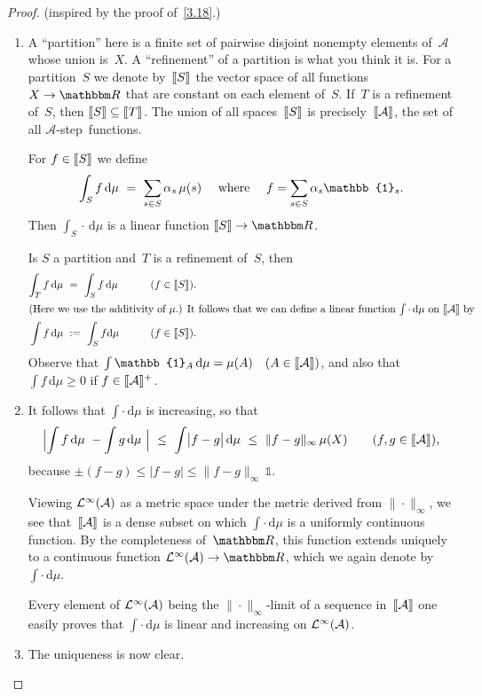\documentclass[main.tex]{subfiles}
\begin{document}
\begin{proof}
(inspired by the proof of~\ref{3.18}.)
\begin{enumerate}[label=(\Roman*)]
\item\label{6.10-I}
A ``partition'' here is a finite set of pairwise disjoint 
nonempty elements of~$\mathcal A$
whose union is~$X$.
A ``refinement'' of a partition is what you think it is.
For a partition~$S$ we denote by~$\lbb S\rbb$
the vector space of all functions $X\ra \R$
that are constant on each element of~$S$.
If~$T$ is a refinement of~$S$,
then $\lbb S \rbb \subseteq \lbb T \rbb$.
The union of all spaces~$\lbb S \rbb$ is precisely~$\lbb \mathcal A \rbb$,
the set of all $\mathcal{A}$-step~functions.

For $f\in\lbb S \rbb$ we define
\begin{equation*}
\int_S f\,\mathrm{d}\mu\ =\ \sum_{s\in S} \alpha_s\,\mu(s)
\quad\htam{ where }\quad f=\sum_{s\in S} \alpha_s \mathbb{1}_s\htam{.}
\end{equation*}
Then $\int_S \cdot\,\mathrm{d}\mu$ is a linear function $\lbb S \rbb \ra \R$.

Is $S$ a partition and~$T$ is a refinement of~$S$, then
\begin{alignat*}{2}
\int_T f\,\mathrm{d}\mu\ &=\ \int_S 
f\,\mathrm{d}\mu\qquad&(f\in \lbb S \rbb)\htam{.} \\
\intertext{(Here we use the additivity of~$\mu$.)
It follows that we can define a linear function $\int\cdot\,\mathrm d\mu$
on~$\lbb \mathcal A \rbb$ by}
\int f\,\mathrm{d}\mu\ &:=\ \int_S f\mathrm{d}\mu
 \qquad &(f\in\lbb S \rbb)\htam{.}
\end{alignat*}
Observe that $\int \mathbb{1}_A\,\mathrm{d}\mu=\mu(A)
\quad(A\in\lbb \mathcal A \rbb)$,
and also that $\int f\,\mathrm{d}\mu\geq 0$
if $f\in\lbb\mathcal{A}\rbb^+$.
%
\item\label{6.10-II}
It follows that $\int\cdot\,\mathrm{d}\mu$ is increasing, so that
\begin{equation*}
\Bigl|\int f\,\mathrm{d}\mu\  -\int g\,\mathrm{d}\mu\  \Bigr|
\ \leq\ \int \bigl|f-g\bigr|\,\mathrm{d}\mu
\ \leq\ \|f-g\|_\infty \,\mu(X)\qquad(f,g\in\lbb \mathcal A \rbb)
\htam{,}
\end{equation*}
because $\pm(f-g)\leq|f-g|\leq\|f-g\|_\infty\,\mathbb{1}$.

Viewing $\mathcal{L}^\infty(\mathcal A)$ as a metric space
under the metric derived from $\|\cdot\|_\infty$,
we see that~$\lbb\mathcal{A}\rbb$ is a dense subset
on which $\int\cdot\,\mathrm d\mu$ is a uniformly continuous function.
By the completeness of~$\R$,
this function extends uniquely to a continuous function
$\BLeb(\mathcal A)\ra \R$,
which we again denote by $\int\cdot\,\mathrm{d}\mu$.

Every element of $\mathcal{L}^\infty(\mathcal A)$ being the $\|\cdot\|_\infty$-limit
of a sequence in~$\lbb\mathcal A\rbb$
one easily proves that $\int\cdot\,\mathrm d\mu$ is linear
and increasing on $\mathcal{L}^\infty(\mathcal A)$.
%
\item\label{6.10-III}
The uniqueness is now clear. \xqed
\end{enumerate}
\end{proof}
\end{document}
